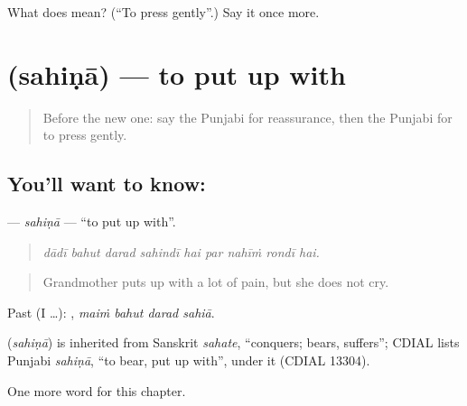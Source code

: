 \begin{tcolorbox}[breakable,colback=teal!4,colframe=teal!35!black,title={Before you move on}]
What does  mean? (\textquotedblleft{}To press gently\textquotedblright{}.) Say it once more.
\end{tcolorbox}
\section[\texorpdfstring{\pa{ਸਹਿਣਾ} (sahiṇā)}{ਸਹਿਣਾ (sahiṇā)}]{ (sahiṇā) — to put up with}

\label{lesson:PA-C328-sahina}



\begin{quote}
Before the new one: say the Punjabi for reassurance, then the Punjabi for to press gently.
\end{quote}

\subsection*{You'll want to know: }
\textbf{} — \emph{sahiṇā} — \textquotedblleft{}to put up with\textquotedblright{}.

\begin{quote}
        
\end{quote}

\begin{quote}
\emph{dādī bahut darad sahindī hai par nahīṁ rondī hai.}
\end{quote}

\begin{quote}
Grandmother puts up with a lot of pain, but she does not cry.
\end{quote}

Past (I …):    , \emph{maiṁ bahut darad sahiā}.

\begin{cousinweb}
\textbf{} (\emph{sahiṇā}) is inherited from Sanskrit \emph{sahate}, \textquotedblleft{}conquers; bears, suffers\textquotedblright{}; CDIAL lists Punjabi \emph{sahiṇā}, \textquotedblleft{}to bear, put up with\textquotedblright{}, under it (CDIAL 13304).
\end{cousinweb}

\begin{grammarlens}[title={What you've built}]
One more word for this chapter.
\end{grammarlens}

